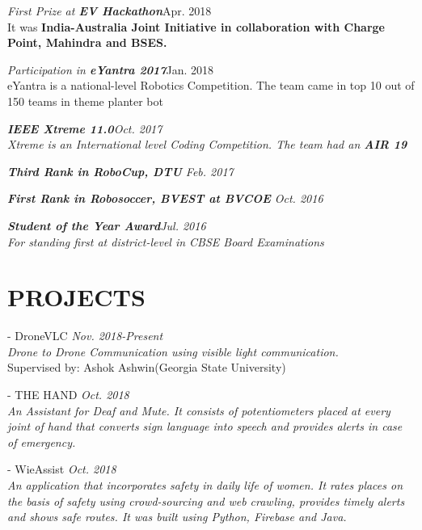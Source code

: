 \documentclass[margin, 10pt]{res} %
\begin{document}
\begin{resume}
{\sl First Prize at  \bf{EV Hackathon}}\hfill {\normalfont Apr. 2018\\ It was } \bf{India-Australia Joint Initiative in collaboration with Charge Point, Mahindra and BSES.}

{\sl Participation in {\bf eYantra 2017}}\hfill {\normalfont Jan. 2018\\ eYantra is a national-level Robotics Competition. The team came in top 10 out of 150 teams in theme planter bot} 


{\sl {\bf IEEE Xtreme 11.0}\hfill{\normalfont Oct. 2017\\ Xtreme is an International level Coding Competition. The team had an {\bf AIR 19} }}

{\sl {\bf Third Rank in RoboCup, DTU}
\hfill {\normalfont Feb. 2017}}

{\sl {\bf First Rank in Robosoccer, BVEST at BVCOE}
\hfill{\normalfont Oct. 2016 }}

{\sl {\bf Student of the Year Award}\hfill{\normalfont Jul. 2016\\ For standing first at district-level in CBSE Board Examinations }}




\section{PROJECTS}
- {DroneVLC}
{\sl \hfill {\normalfont Nov. 2018-Present}\\ Drone to Drone Communication using visible light communication.}\\Supervised by: Ashok Ashwin(Georgia State University)

- {THE HAND}
{\sl \hfill {\normalfont Oct. 2018}\\ An Assistant for Deaf and Mute.
It consists of potentiometers placed at every joint of hand that converts sign language into speech and provides alerts in case of emergency.}

- {WieAssist}
{\sl \hfill {\normalfont Oct. 2018}\\ An application that incorporates safety in daily life of women. 
It rates places on the basis of safety using crowd-sourcing and web crawling, provides timely alerts and shows safe routes. It was built using Python, Firebase and Java.}




\end{resume}
\end{document}
